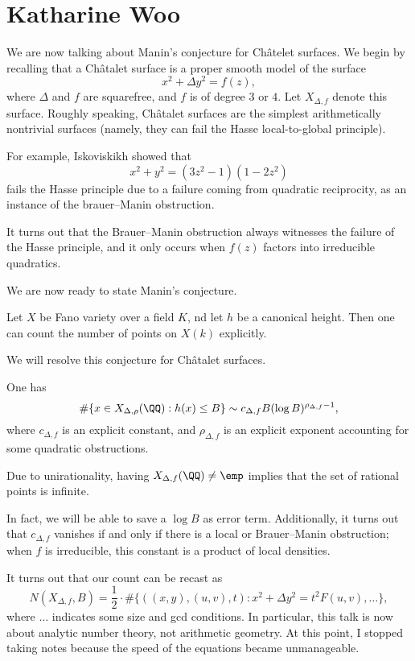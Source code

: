\documentclass{article}
\begin{document}
\section{Katharine Woo}
We are now talking about Manin's conjecture for Ch\^atelet surfaces. We begin by recalling that a Ch\^atalet surface is a proper smooth model of the surface
\[x^2+\Delta y^2=f(z),\]
where $\Delta$ and $f$ are squarefree, and $f$ is of degree $3$ or $4$. Let $X_{\Delta,f}$ denote this surface. Roughly speaking, Ch\^atalet surfaces are the simplest arithmetically nontrivial surfaces (namely, they can fail the Hasse local-to-global principle).
\begin{example}
	For example, Iskoviskikh showed that
	\[x^2+y^2=\left(3z^2-1\right)\left(1-2z^2\right)\]
	fails the Hasse principle due to a failure coming from quadratic reciprocity, as an instance of the brauer--Manin obstruction.
\end{example}
It turns out that the Brauer--Manin obstruction always witnesses the failure of the Hasse principle, and it only occurs when $f(z)$ factors into irreducible quadratics.

We are now ready to state Manin's conjecture.
\begin{conj}[Manin]
	Let $X$ be  Fano variety over a field $K$, nd let $h$ be a canonical height. Then one can count the number of points on $X(k)$ explicitly.
\end{conj}
We will resolve this conjecture for Ch\^atalet surfaces.
\begin{theorem}
	One has
	\[\#\{x\in X_{\Delta,\rho}(\QQ):h(x)\le B\}\sim c_{\Delta,f}B(\log B)^{\rho_{\Delta,f}-1},\]
	where $c_{\Delta,f}$ is an explicit constant, and $\rho_{\Delta,f}$ is an explicit exponent accounting for some quadratic obstructions.
\end{theorem}
\begin{remark}
	Due to unirationality, having $X_{\Delta,f}(\QQ)\ne\emp$ implies that the set of rational points is infinite.
\end{remark}
\begin{remark}
	In fact, we will be able to save a $\log B$ as error term. Additionally, it turns out that $c_{\Delta,f}$ vanishes if and only if there is a local or Brauer--Manin obstruction; when $f$ is irreducible, this constant is a product of local densities.
\end{remark}
It turns out that our count can be recast as
\[N(X_{\Delta,f},B)=\frac12\cdot\#\{((x,y),(u,v),t):x^2+\Delta y^2=t^2F(u,v),\ldots\},\]
where $\ldots$ indicates some size and gcd conditions. In particular, this talk is now about analytic number theory, not arithmetic geometry. At this point, I stopped taking notes because the speed of the equations became unmanageable.
\end{document}
